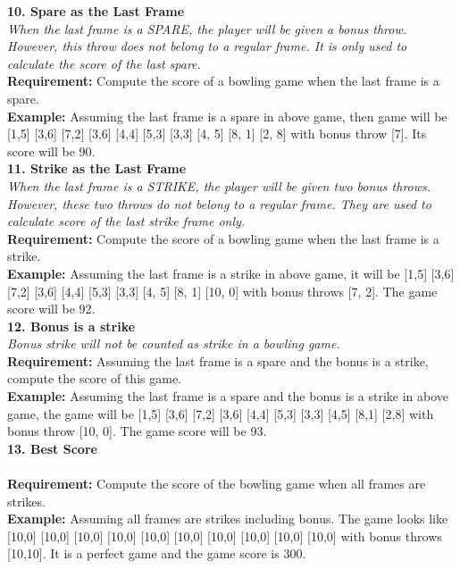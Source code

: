 \noindent \textbf{10. Spare as the Last Frame} \\
\textit{When the last frame is a SPARE, the player will be given a bonus throw. However, this throw does not belong to a regular frame. It is only used to calculate the score of the last spare.} \\
\textbf{Requirement:} Compute the score of a bowling game when the last frame is a spare. \\
\textbf{Example:} Assuming the last frame is a spare in above game,  then game will be [1,5] [3,6] [7,2] [3,6] [4,4] [5,3] [3,3] [4, 5] [8, 1] [2, 8] with bonus throw [7]. Its score will be 90. \\

\noindent \textbf{11. Strike as the Last Frame} \\
\textit{When the last frame is a STRIKE, the player will be given two bonus throws. However, these two throws do not belong to a regular frame. They are used to calculate score of the last strike frame only.} \\
\textbf{Requirement:} Compute the score of a bowling game when the last frame is a strike. \\
\textbf{Example:} Assuming the last frame is a strike in above game,  it will be [1,5] [3,6] [7,2] [3,6] [4,4] [5,3] [3,3] [4, 5] [8, 1] [10, 0] with bonus throws [7, 2]. The game score will be 92. \\

\noindent \textbf{12. Bonus is a strike} \\
\textit{Bonus strike will not be counted as strike in a bowling game.} \\
\textbf{Requirement:} Assuming the last frame is a spare and the bonus is a strike, compute the score of this game.\\
\textbf{Example:} Assuming the last frame is a spare and the bonus is a strike in above game,  the game will be [1,5] [3,6] [7,2] [3,6] [4,4] [5,3] [3,3] [4,5] [8,1] [2,8] with bonus throw [10, 0]. The game score will be 93. \\

\noindent \textbf{13. Best Score} \\
\textit{} \\
\textbf{Requirement:} Compute the score of the bowling game when all frames are strikes.\\
\textbf{Example:} Assuming all frames are strikes including bonus. The game looks like [10,0] [10,0] [10,0] [10,0] [10,0] [10,0] [10,0] [10,0] [10,0] [10,0] with bonus throws [10,10]. It is a perfect game and the game score is 300. \\

